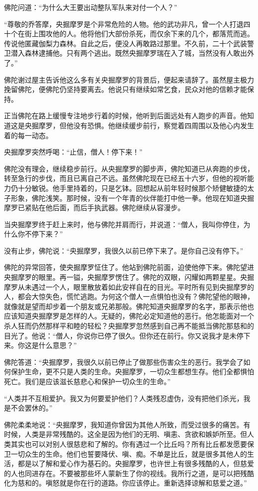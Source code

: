 \documentclass[12pt,twoside,openany]{book}
\begin{document}
佛陀问道：“为什么大王要出动整队军队来对付一个人？”

“尊敬的乔答摩，央掘摩罗是个非常危险的人物。他的武功非凡，曾一个人打退四十个在街上围攻他的人。他将他们大部份杀死，而仅余下来的几个，都落荒而逃。传说他匿藏伽梨力森林。自此之后，便没人再敢路过那里。不久前，二十个武装警卫潜入森林逮捕他。只有两个逃出。既然央掘摩罗瑞在入了城，当然没有人敢出外了。”

佛陀谢过屋主告诉他这么多有关央掘摩罗的背景后，便起来请辞了。虽然屋主极力挽留佛陀，便佛陀仍坚持要离去。他说只有继续如常乞食，民众对他的信赖才能保持。

正当佛陀在路上缓慢专注地步行着的时候，他听到后面远处有人跑步的声音。他知道这是央掘摩罗，但他没有恐惧。他继续缓步前行，察觉着四周围以及他心内发生着的每一动态。

央掘摩罗突然呼喝：“止信，僧人！停下来！”

佛陀没有理会，继续稳步前行。从央掘摩罗的脚步声，佛陀知道已从奔跑的步伐，转至急行的步伐，而且已离自己不远。虽然佛陀现在已经五十六岁，但他的视听能力仍十分敏锐。他手里持着的，只是乞钵。回想起从前年轻时候那个矫健敏捷的太子形象，佛陀浅笑。那时候，没有一个年青的伙伴能打中他一拳。他现在知道央掘摩罗已紧贴在他后面，而后手执武器。佛陀继续从容漫步。

当央掘摩罗终于赶上来时，他与佛陀并肩而行，并说道：“僧人，我叫你停住，为什么你不停下来？”

没有止步，佛陀说：“央掘摩罗，我很久以前已停下来了。是你自己没有停下。”

佛陀的异常回答，使央掘摩罗怔住了。他站到佛陀前面，迫使他停下来。佛陀望进央掘摩罗的眼里。再一镒，央掘摩罗愣住了。佛陀的双眼，闪耀如两颗星星。央掘摩罗从未遇过一个人，眼里散放着如此安祥自在的目光。平时所有见到央掘摩罗的人，都会大惊失色，慌忙逃跑。为何这个僧人一点惧怕也没有？佛陀望他的眼神，就像就是望而却步着一个朋友或兄弟那般。佛陀知道央掘摩罗的名字，那表示他也应该知道央掘摩罗是怎样的人。无疑的，佛陀必定知道他的恶行。他怎能面对一个杀人狂而仍然那样平和睦的轻松？央掘摩罗忽然感到自己再不能抵当佛陀那慈和的目光了。他说：“僧人，你说你已停了很久。但你还在前行。你又说我才是未停下来。你这是什么意思？”

佛陀答道：“央掘摩罗，我很久以前已停止了做那些伤害众生的恶行。我学会了如何保护生命，更不只是人类的生命。央掘摩罗，一切众生都想生存。他们全都惧怕死亡。我们是应该滋长慈悲心和保护一切众生的生命。”

“人类并不互相爱护。我又为何要爱护他们？人类残忍虚伪，没有把他们杀光，我是不会罢休的。”

佛陀柔柔地说：“央掘摩罗，我知道你曾因为其他人所致，而受过很多的痛苦。有时候，人类是非常残酷的。这全是因为他们的无明、嗔恚、贪欲和嫉妒所至。但人类其实也可以对别人很慈悲和了解的。你有遇过一个比丘吗？所有比丘都发愿要保卫一切众生的生命。他们也誓要降伏、嗔、痴。不单是比丘，就是很多其他人的生活，都是以了解和爱心作为基石的。央掘摩罗，也许世上有很多残酷的人，但慈爱的人也同进存在。不要被那些坏人蒙新生了你的视线。我所行之道，是可以把残酷化为慈和的。嗔怒就是你在行的道路。你应该停止。重新选择谅解和慈爱之道。”
\end{document}
